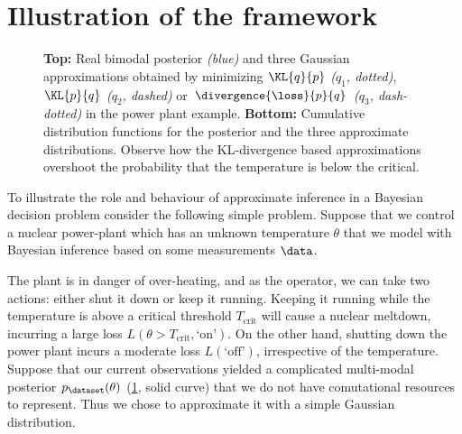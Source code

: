 \section{Illustration of the framework \label{sec:toy}}

\begin{figure}
\centering
{}
 \caption[Illustrating of approximate inference in a loss-critical toy example]{\textbf{Top:} Real bimodal posterior \emph{(blue)} and three Gaussian approximations obtained by minimizing  $\KL{q}{p}$ \emph{($q_1$, dotted)}, $\KL{p}{q}$ \emph{($q_2$, dashed)} or $\divergence{\loss}{p}{q}$ \emph{($q_3$, dash-dotted)} in the power plant example. \textbf{Bottom:} Cumulative distribution functions for the posterior and the three approximate distributions. Observe how the KL-divergence based approximations overshoot the probability that the temperature is below the critical.}  \label{fig:toy}
\end{figure}

To illustrate the role and behaviour of approximate inference in a Bayesian decision problem consider the following simple problem. Suppose that we control a nuclear power-plant which has an unknown temperature $\theta$ that we model with Bayesian inference based on some measurements $\data$.

The plant is in danger of over-heating, and as the operator, we can take two actions: either shut it down or keep it running. Keeping it running while the temperature is above a critical threshold $T_\mathrm{crit}$ will cause a nuclear meltdown, incurring a large loss $L(\theta>T_\mathrm{crit},\mbox{`on'})$. On the other hand, shutting down the power plant incurs a moderate loss $L(\mbox{`off'})$, irrespective of the temperature. 
Suppose that our current observations yielded a complicated multi-modal posterior $p_\dataset(\theta)$ (\ref{fig:toy}, solid curve) that we do not have comutational resources to represent. Thus we chose to approximate it with a simple Gaussian distribution.

